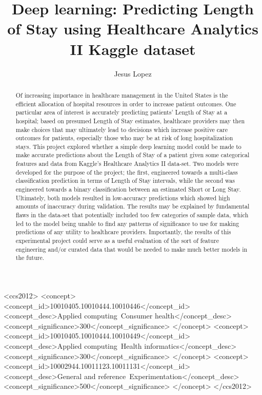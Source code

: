 \documentclass[sigconf,authorversion]{acmart}
\begin{document}
\title{Deep learning: Predicting Length of Stay using Healthcare Analytics II Kaggle dataset }
\author{Jesus Lopez}
%
\begin{abstract}
  Of increasing importance in healthcare management in the United States is the efficient allocation of hospital resources in order to increase patient outcomes. One particular area of interest is accurately predicting patients' Length of Stay at a hospital; based on presumed Length of Stay estimates, healthcare providers may then make choices that may ultimately lead to decisions which increase positive care outcomes for patients, especially those who may be at risk of long hospitalization stays. This project explored whether a simple deep learning model could be made to make accurate predictions about the Length of Stay of a patient given some categorical features and data from Kaggle's Healthcare Analytics II data-set. Two models were developed for the purpose of the project; the first, engineered towards a multi-class classification prediction in terms of Length of Stay intervals, while the second was engineered towards a binary classification between an estimated Short or Long  Stay. Ultimately, both models resulted in low-accuracy predictions which showed high amounts of inaccuracy during validation. The results may be explained by fundamental flaws in the data-set that potentially included too few categories of sample data, which led to the model being unable to find any patterns of significance to use for making predictions of any utility to healthcare providers. Importantly, the  results of this experimental project could serve as a useful evaluation of the sort of feature engineering and/or curated data that would be needed to make much better models in the future.
\end{abstract}
%
%
\begin{CCSXML}
<ccs2012>
   <concept>
       <concept_id>10010405.10010444.10010446</concept_id>
       <concept_desc>Applied computing~Consumer health</concept_desc>
       <concept_significance>300</concept_significance>
       </concept>
   <concept>
       <concept_id>10010405.10010444.10010449</concept_id>
       <concept_desc>Applied computing~Health informatics</concept_desc>
       <concept_significance>300</concept_significance>
       </concept>
   <concept>
       <concept_id>10002944.10011123.10011131</concept_id>
       <concept_desc>General and reference~Experimentation</concept_desc>
       <concept_significance>500</concept_significance>
       </concept>
 </ccs2012>
\end{CCSXML}
%
%
\maketitle
\end{document}
